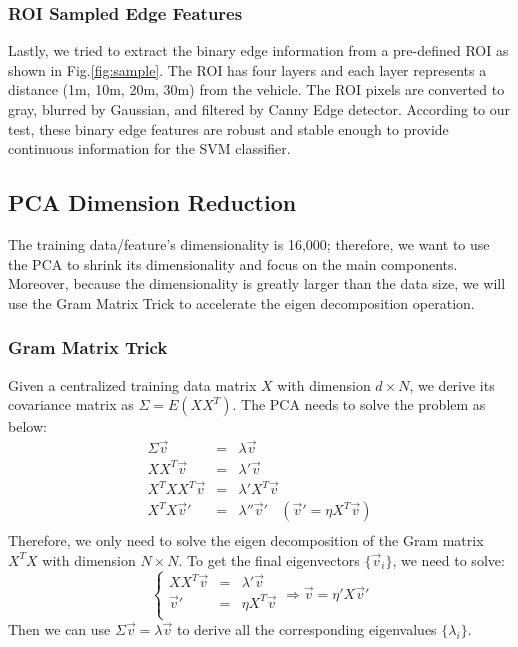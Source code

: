 \documentclass[10pt,twocolumn,letterpaper]{article}
\begin{document}
\subsubsection{ROI Sampled Edge Features}
Lastly, we tried to extract the binary edge information from a pre-defined ROI as shown in Fig.\ref{fig:sample}. The ROI has four layers and each layer represents a distance (1m, 10m, 20m, 30m) from the vehicle. The ROI pixels are converted to gray, blurred by Gaussian, and filtered by Canny Edge detector. According to our test, these binary edge features are robust and stable enough to provide continuous information for the SVM classifier.

\subsection{PCA Dimension Reduction}

The training data/feature's dimensionality is 16,000; therefore, we want to use the PCA to shrink its dimensionality and focus on the main components. Moreover, because the dimensionality is greatly larger than the data size, we will use the Gram Matrix Trick to accelerate the eigen decomposition operation.

\subsubsection{Gram Matrix Trick}

Given a centralized training data matrix $X$ with dimension $d \times N$, we derive its covariance matrix as $\Sigma=E(XX^{T})$. The PCA needs to solve the problem as below:
\begin{equation}
\begin{array}{rcl}
\Sigma \vec{v} & = & \lambda \vec{v} \\
XX^T\vec{v} & = & \lambda' \vec{v} \\
X^TXX^T\vec{v} & = & \lambda' X^T \vec{v} \\
X^TX\vec{v}' & = & \lambda'' \vec{v}'~~~~(\vec{v}'=\eta X^T\vec{v}) \\
\end{array}
\end{equation}
Therefore, we only need to solve the eigen decomposition of the Gram matrix $X^TX$ with dimension $N \times N$. To get the final eigenvectors $\{\vec{v}_i\}$, we need to solve:
\begin{equation}
\left\{\begin{array}{rcl}
XX^T\vec{v} & = & \lambda' \vec{v} \\
\vec{v}' & = & \eta X^T \vec{v} \\
\end{array}\right. \Rightarrow \vec{v}=\eta' X\vec{v}'
\end{equation}
Then we can use $\Sigma\vec{v}=\lambda\vec{v}$ to derive all the corresponding eigenvalues $\{\lambda_i\}$.
\end{document}

